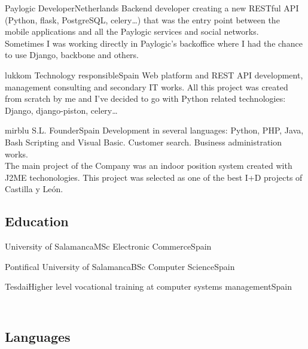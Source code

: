 \documentclass[11pt, a4paper, sans]{moderncv}
\begin{document}
{Paylogic}
{Developer}{Netherlands}{}
{Backend developer creating a new RESTful API (Python, flask, PostgreSQL,
celery\ldots) that was the entry point between the mobile applications and all
the Paylogic services and social networks.\\Sometimes I was working directly in
Paylogic's backoffice where I had the chance to use Django, backbone and others.\\}

{lukkom}
{Technology responsible}{Spain}{}
{Web platform and REST API development, management consulting and secondary IT
works. All this project was created from scratch by me and I've decided to go
with Python related technologies: Django, django-piston, celery\ldots\\}

{mirblu S.L.}
{Founder}{Spain}{}
{Development in several languages: Python, PHP, Java, Bash Scripting and Visual
Basic. Customer search. Business administration works.\\The main project of the
Company was an indoor position system created with J2ME techonologies. This
project was selected as one of the best I+D projects of Castilla y León.\\}


%
%

\subsection{Education}
{University of Salamanca}{MSc Electronic Commerce}{Spain}{}{}

{Pontifical University of Salamanca}{BSc Computer Science}{Spain}{}{}

{Tesdai}{Higher level vocational training at computer systems management}{Spain}{}{}

%
%

\subsection{\\Languages}
\end{document}

